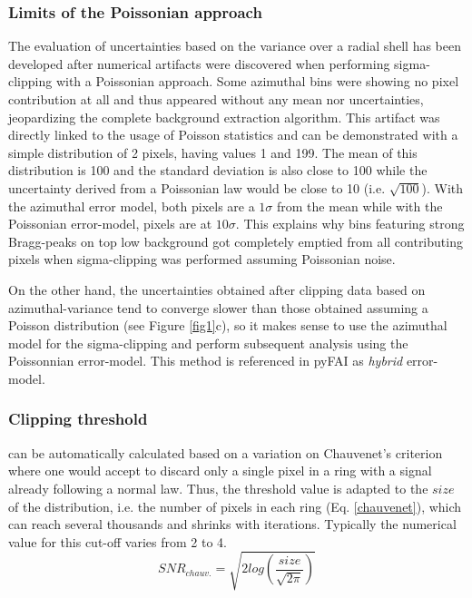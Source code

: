 \documentclass[preprint]{iucr}              %
\begin{document}
\subsubsection{Limits of the Poissonian approach}

The evaluation of uncertainties based on the variance over a radial shell has been developed after numerical artifacts were discovered when performing sigma-clipping with a Poissonian approach. Some azimuthal bins were showing no pixel contribution at all and thus appeared without any mean nor uncertainties, jeopardizing the complete background extraction algorithm. 
This artifact was directly linked to the usage of Poisson statistics and can be demonstrated with a simple distribution of 2 pixels, having values 1 and 199. 
The mean of this distribution is 100 and the standard deviation is also close to 100 while the uncertainty derived from a Poissonian law would  be close to 10 (i.e. $\sqrt{100}$). 
With the azimuthal error model, both pixels are a $1\sigma$ from the mean while with the Poissonian error-model, pixels are at $10 \sigma$.  
This explains why bins featuring strong Bragg-peaks on top low background got completely emptied from all contributing pixels when sigma-clipping was performed assuming Poissonian noise.

On the other hand, the uncertainties obtained after clipping data based on azimuthal-variance tend to converge slower than those obtained assuming a Poisson distribution (see Figure \ref{fig1}c), so it makes sense to use the azimuthal model for the sigma-clipping and perform subsequent analysis using the Poissonnian error-model. This method is referenced in pyFAI as \textit{hybrid} error-model.

\subsubsection{Clipping threshold}
can be automatically calculated based on a variation on Chauvenet's criterion \cite{chauvenet} where one would accept to discard only a single pixel in a ring with a signal already following a normal law. 
Thus, the threshold value is adapted to the $size$ of the distribution, i.e. the number of pixels in each ring (Eq. \ref{chauvenet}), which can reach several thousands and shrinks with iterations.
Typically the numerical value for this cut-off varies from 2 to 4.   
\begin{equation}
\label{chauvenet}
SNR_{chauv.} =  \sqrt{2 log(\frac{size}{\sqrt{2 \pi}})}
\end{equation}
\end{document}
